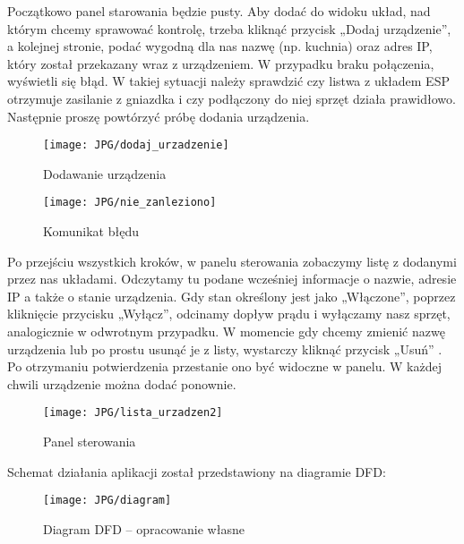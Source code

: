 \documentclass{xmgr}
\begin{document}
Początkowo panel starowania będzie pusty. Aby dodać do widoku układ, nad którym chcemy sprawować kontrolę, trzeba kliknąć przycisk „Dodaj urządzenie”, a kolejnej stronie, podać  wygodną dla nas nazwę (np. kuchnia) oraz adres IP, który został przekazany wraz z urządzeniem. W przypadku braku połączenia, wyświetli się błąd. W takiej sytuacji należy sprawdzić czy listwa z układem ESP otrzymuje zasilanie z gniazdka i czy podłączony do niej sprzęt działa prawidłowo. Następnie proszę powtórzyć próbę dodania urządzenia. 

\begin{figure}
\begin{center}
\texttt{[image: JPG/dodaj\_urzadzenie]}
\caption{Dodawanie urządzenia}
\end{center}
\end{figure}

\begin{figure}
\begin{center}
\texttt{[image: JPG/nie\_zanleziono]}
\caption{Komunikat błędu}
\end{center}
\end{figure}

\newpage Po przejściu wszystkich kroków, w panelu sterowania zobaczymy listę z dodanymi przez nas układami. Odczytamy tu podane wcześniej informacje o nazwie, adresie IP a także o stanie urządzenia. Gdy stan określony jest jako „Włączone”, poprzez kliknięcie przycisku „Wyłącz”, odcinamy dopływ prądu i wyłączamy nasz sprzęt, analogicznie w odwrotnym przypadku. W momencie gdy chcemy zmienić nazwę urządzenia lub po prostu usunąć je z listy, wystarczy kliknąć przycisk „Usuń” . Po otrzymaniu potwierdzenia przestanie ono być widoczne w panelu. W każdej chwili urządzenie można dodać ponownie. 

\hspace{2cm}
\begin{figure}[h]
\begin{center}
\texttt{[image: JPG/lista\_urzadzen2]}
\caption{Panel sterowania}
\end{center}
\end{figure}

Schemat działania aplikacji został przedstawiony na diagramie DFD:

\begin{figure}[h]
\begin{center}
\texttt{[image: JPG/diagram]}
\caption{Diagram DFD -- opracowanie własne}
\label{Diagram}
\end{center}
\end{figure}
\end{document}
